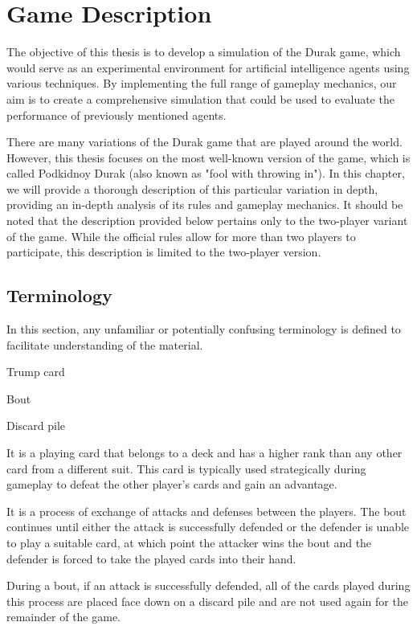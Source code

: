 \chapter{Game Description}
The objective of this thesis is to develop a simulation of the Durak game, which would serve as an experimental environment for artificial intelligence agents using various techniques. By implementing the full range of gameplay mechanics, our aim is to create a comprehensive simulation that could be used to evaluate the performance of previously mentioned agents.

There are many variations of the Durak game that are played around the world. However, this thesis focuses on the most well-known version of the game, which is called Podkidnoy Durak (also known as "fool with throwing in"). In this chapter, we will provide a thorough description of this particular variation in depth, providing an in-depth analysis of its rules and gameplay mechanics. It should be noted that the description provided below pertains only to the two-player variant of the game. While the official rules allow for more than two players to participate, this description is limited to the two-player version.

\section{Terminology}
In this section, any unfamiliar or potentially confusing terminology is defined to facilitate understanding of the material.\\

\begin{enumerate}
\begin{paracol}{2}


        \item Trump card \\
        \item Bout
        \item Discard pile

\switchcolumn
        \item It is a playing card that belongs to a deck and has a higher rank than any other card from a different suit. This card is typically used strategically during gameplay to defeat the other player's cards and gain an advantage.
        \item It is a process of exchange of attacks and defenses between the players. The bout continues until either the attack is successfully defended or the defender is unable to play a suitable card, at which point the attacker wins the bout and the defender is forced to take the played cards into their hand.
        \item During a bout, if an attack is successfully defended, all of the cards played during this process are placed face down on a discard pile and are not used again for the remainder of the game.

\end{paracol}
\end{enumerate}

